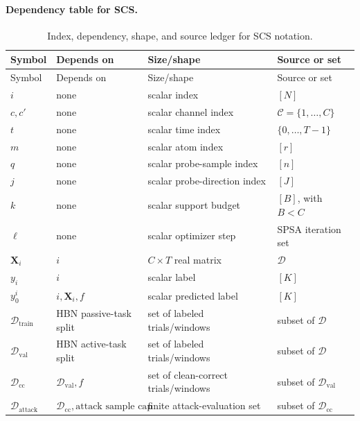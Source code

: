 \documentclass[11pt]{article}
\begin{document}
\paragraph{Dependency table for SCS.}
\begingroup
\footnotesize
\setlength{\tabcolsep}{3pt}
\renewcommand{\arraystretch}{1.15}
\begin{longtable}{@{}>{\raggedright\arraybackslash}p{}
>{\raggedright\arraybackslash}p{}
>{\raggedright\arraybackslash}p{}
>{\raggedright\arraybackslash}p{}@{}}
\caption{Index, dependency, shape, and source ledger for SCS notation.}
\label{tab:dependency-ledger}\\
\toprule
Symbol & Depends on & Size/shape & Source or set \\
\midrule
\endfirsthead
\toprule
Symbol & Depends on & Size/shape & Source or set \\
\midrule
\endhead
$i$ & none & scalar index & $[N]$ \\
$c,c'$ & none & scalar channel index & $\mathcal{C}=\{1,\ldots,C\}$ \\
$t$ & none & scalar time index & $\{0,\ldots,T-1\}$ \\
$m$ & none & scalar atom index & $[r]$ \\
$q$ & none & scalar probe-sample index & $[n]$ \\
$j$ & none & scalar probe-direction index & $[J]$ \\
$k$ & none & scalar support budget & $[B]$, with $B<C$ \\
$\ell$ & none & scalar optimizer step & SPSA iteration set \\
$\mathbf{X}_i$ & $i$ & $C\times T$ real matrix & $\mathcal{D}$ \\
$y_i$ & $i$ & scalar label & $[K]$ \\
$y_0^i$ & $i,\mathbf{X}_i,f$ & scalar predicted label & $[K]$ \\
$\mathcal{D}_{\mathrm{train}}$ & HBN passive-task split & set of labeled trials/windows & subset of $\mathcal{D}$ \\
$\mathcal{D}_{\mathrm{val}}$ & HBN active-task split & set of labeled trials/windows & subset of $\mathcal{D}$ \\
$\mathcal{D}_{\mathrm{cc}}$ & $\mathcal{D}_{\mathrm{val}},f$ & set of clean-correct trials/windows & subset of $\mathcal{D}_{\mathrm{val}}$ \\
$\mathcal{D}_{\mathrm{attack}}$ & $\mathcal{D}_{\mathrm{cc}},\text{attack sample cap}$ & finite attack-evaluation set & subset of $\mathcal{D}_{\mathrm{cc}}$ \\

\end{longtable}
\end{document}
